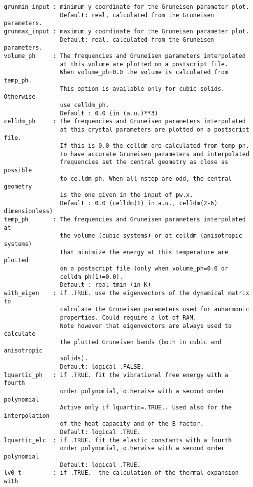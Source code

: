 \documentclass[12pt,a4paper]{article}
\begin{document}
\begin{verbatim}
grunmin_input : minimum y coordinate for the Gruneisen parameter plot.
                Default: real, calculated from the Gruneisen parameters.
grunmax_input : maximum y coordinate for the Gruneisen parameter plot.
                Default: real, calculated from the Gruneisen parameters.
volume_ph     : The frequencies and Gruneisen parameters interpolated 
                at this volume are plotted on a postscript file. 
                When volume_ph=0.0 the volume is calculated from temp_ph.
                This option is available only for cubic solids. Otherwise
                use celldm_ph.
                Default : 0.0 (in (a.u.)**3)
celldm_ph     : The frequencies and Gruneisen parameters interpolated 
                at this crystal parameters are plotted on a postscript file. 
                If this is 0.0 the celldm are calculated from temp_ph.
                To have accurate Gruneisen parameters and interpolated
                frequencies set the central geometry as close as possible 
                to celldm_ph. When all nstep are odd, the central geometry 
                is the one given in the input of pw.x.
                Default : 0.0 (celldm(1) in a.u., celldm(2-6) dimensionless)
temp_ph       : The frequencies and Gruneisen parameters interpolated at 
                the volume (cubic systems) or at celldm (anisotropic systems)
                that minimize the energy at this temperature are plotted 
                on a postscript file (only when volume_ph=0.0 or 
                celldm_ph(1)=0.0).
                Default : real tmin (in K)
with_eigen    : if .TRUE. use the eigenvectors of the dynamical matrix to
                calculate the Gruneisen parameters used for anharmonic 
                properties. Could require a lot of RAM.
                Note however that eigenvectors are always used to calculate
                the plotted Gruneisen bands (both in cubic and anisotropic
                solids).
                Default: logical .FALSE. 
lquartic_ph   : if .TRUE. fit the vibrational free energy with a fourth
                order polynomial, otherwise with a second order polynomial
                Active only if lquartic=.TRUE.. Used also for the interpolation
                of the heat capacity and of the B factor.
                Default: logical .TRUE.
lquartic_elc  : if .TRUE. fit the elastic constants with a fourth
                order polynomial, otherwise with a second order polynomial
                Default: logical .TRUE.
lv0_t         : if .TRUE.  the calculation of the thermal expansion with 

\end{verbatim}
\end{document}
